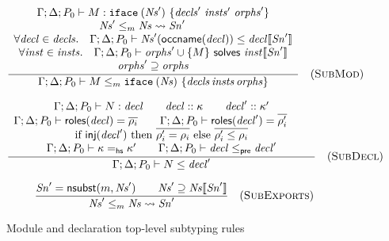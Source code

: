 \begin{figure}


\[
\frac{
\begin{array}{c}
\Gamma; \Delta; P_0 \vdash M : \texttt{iface}\:(\mathit{Ns}')~\{\mathit{decls}'~\mathit{insts}'~\mathit{orphs}'\} \\
\mathit{Ns}' \le_m \mathit{Ns} \leadsto \mathit{Sn}' \qquad \\
\forall \mathit{decl} \in \mathit{decls}.\quad \Gamma; \Delta; P_0 \vdash \mathit{Ns}'(\textsf{occname}(\mathit{decl})) \le \mathit{decl}\llbracket\mathit{Sn}'\rrbracket \\
\forall \mathit{inst} \in \mathit{insts}.\quad \Gamma; \Delta; P_0 \vdash \mathit{orphs}' \cup \{ M \} ~\textsf{solves}~ \mathit{inst}\llbracket\mathit{Sn}'\rrbracket \\
\mathit{orphs}' \supseteq \mathit{orphs} \\
\end{array}
}{
\Gamma; \Delta; P_0 \vdash M \le_m \texttt{iface}\:(\mathit{Ns})~\{\mathit{decls}\, \mathit{insts}\, \mathit{orphs}\}
}
\quad(\textsc{SubMod})
\]


\[
\frac{
\begin{array}{c}
\Gamma; \Delta; P_0 \vdash N : \mathit{decl} \qquad
\mathit{decl} :: \kappa \qquad
\mathit{decl}' :: \kappa' \\
\Gamma; \Delta; P_0 \vdash \textsf{roles}(\mathit{decl}) = \overline{\rho_i} \qquad
\Gamma; \Delta; P_0 \vdash \textsf{roles}(\mathit{decl}') = \overline{\rho'_i} \qquad
\\
\textrm{if}~\textsf{inj}(\mathit{decl}')
    ~\textrm{then}~ \overline{\rho'_i = \rho_i}
    ~\textrm{else}~ \overline{\rho'_i \le \rho_i} \\
\Gamma; \Delta; P_0 \vdash \kappa =_\mathsf{hs} \kappa' \qquad
\Gamma; \Delta; P_0 \vdash \mathit{decl} \le_\textsf{pre} \mathit{decl}'
\end{array}
}{
\Gamma; \Delta; P_0 \vdash N \le \mathit{decl}'
}
\quad(\textsc{SubDecl})
\]


\[
\frac{
\mathit{Sn}' = \textsf{nsubst}(m, \mathit{Ns}') \qquad
\mathit{Ns}' \supseteq \mathit{Ns}\llbracket\mathit{Sn}'\rrbracket
}{
\mathit{Ns}' \le_m \mathit{Ns} \leadsto \mathit{Sn}'
}
\quad(\textsc{SubExports})
\]

\caption{Module and declaration top-level subtyping rules}
\label{typing:top-subtyping}

\end{figure}

